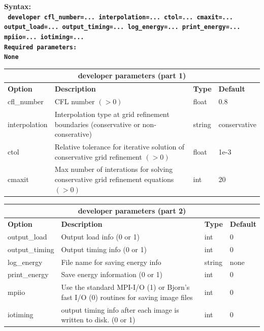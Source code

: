 \documentclass[11pt]{report}
\begin{document}
\begin{flushleft}\bf
Syntax:\\
\tt
developer
cfl\_number=... interpolation=... ctol=... cmaxit=... output\_load=... output\_timing=... log\_energy=... print\_energy=... mpiio=... iotiming=... \\
\bf Required parameters:\\
\rm
None
\end{flushleft}
\begin{center}
\begin{tabular}{|l|p{10cm}|l|l|} \hline
\multicolumn{4}{|c|}{\bf developer parameters (part 1)}\\ \hline
\bf{Option}   & \bf{Description} & \bf{Type} & \bf{Default} \\ \hline \hline
cfl\_number   & CFL number $(>0)$ & float &  0.8\\ \hline
interpolation & Interpolation type at grid refinement boundaries (conservative or non-conserative) &
string & conservative \\ \hline 
ctol          & Relative tolerance for iterative solution of conservative grid refinement $(>0)$ & float & 1e-3
\\ \hline
cmaxit        & Max number of interations for solving conservative grid refinement equations $(>0)$ & int & 20
\\ \hline
\end{tabular}
\end{center}
\begin{center}
\begin{tabular}{|l|p{10cm}|l|l|} \hline
\multicolumn{4}{|c|}{\bf developer parameters (part 2)}\\ \hline
\bf{Option}   & \bf{Description} & \bf{Type} & \bf{Default} \\ \hline \hline
output\_load  & Output load info (0 or 1) & int & 0 \\ \hline
output\_timing & Output timing info (0 or 1) & int & 0 \\ \hline
log\_energy   & File name for saving energy info & string & none \\ \hline
print\_energy & Save energy information (0 or 1) & int & 0 \\ \hline
mpiio         & Use the standard MPI-I/O (1) or Bjorn's fast I/O (0) routines for saving image files & int & 0 \\ \hline
iotiming      & output timing info after each image is written to disk. (0 or 1) & int & 0 \\ \hline
\end{tabular}
\end{center}
\end{document}
